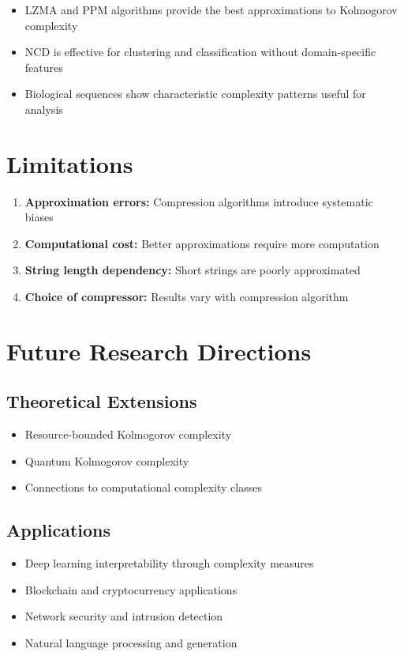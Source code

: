 \documentclass[12pt,a4paper]{report}
\begin{document}
\begin{itemize}
    \item LZMA and PPM algorithms provide the best approximations to Kolmogorov complexity
    \item NCD is effective for clustering and classification without domain-specific features
    \item Biological sequences show characteristic complexity patterns useful for analysis
\end{itemize}

\section{Limitations}

\begin{enumerate}
    \item \textbf{Approximation errors:} Compression algorithms introduce systematic biases
    \item \textbf{Computational cost:} Better approximations require more computation
    \item \textbf{String length dependency:} Short strings are poorly approximated
    \item \textbf{Choice of compressor:} Results vary with compression algorithm
\end{enumerate}

\section{Future Research Directions}

\subsection{Theoretical Extensions}

\begin{itemize}
    \item Resource-bounded Kolmogorov complexity
    \item Quantum Kolmogorov complexity
    \item Connections to computational complexity classes
\end{itemize}

\subsection{Applications}

\begin{itemize}
    \item Deep learning interpretability through complexity measures
    \item Blockchain and cryptocurrency applications
    \item Network security and intrusion detection
    \item Natural language processing and generation
\end{itemize}
\end{document}
